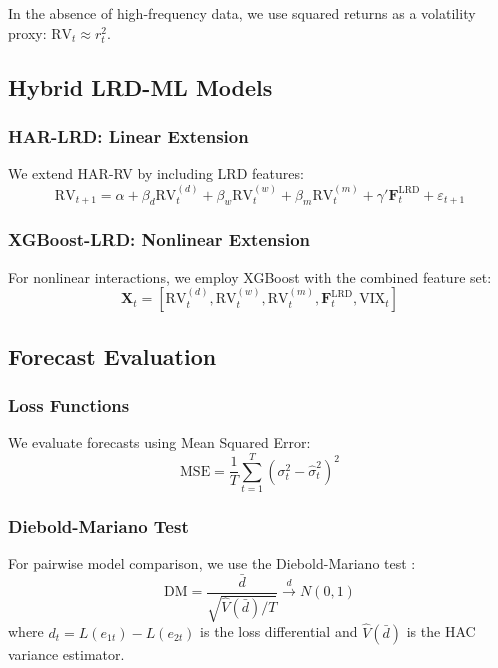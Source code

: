 \documentclass[12pt,a4paper]{article}
\newcommand{\RV}{\text{RV}}
\newcommand{\VIX}{\text{VIX}}
\newcommand{\MSE}{\text{MSE}}
\begin{document}
In the absence of high-frequency data, we use squared returns as a volatility proxy: $\RV_t \approx r_t^2$.

\subsection{Hybrid LRD-ML Models}

\subsubsection{HAR-LRD: Linear Extension}

We extend HAR-RV by including LRD features:
\begin{equation}
    \RV_{t+1} = \alpha + \beta_d \RV_t^{(d)} + \beta_w \RV_t^{(w)} + \beta_m \RV_t^{(m)} + \gamma' \mathbf{F}_t^{\text{LRD}} + \varepsilon_{t+1}
\end{equation}

\subsubsection{XGBoost-LRD: Nonlinear Extension}

For nonlinear interactions, we employ XGBoost \citep{chen2016xgboost} with the combined feature set:
\begin{equation}
    \mathbf{X}_t = [\RV_t^{(d)}, \RV_t^{(w)}, \RV_t^{(m)}, \mathbf{F}_t^{\text{LRD}}, \VIX_t]
\end{equation}

\subsection{Forecast Evaluation}

\subsubsection{Loss Functions}

We evaluate forecasts using Mean Squared Error:
\begin{equation}
    \MSE = \frac{1}{T}\sum_{t=1}^T (\sigma_t^2 - \hat{\sigma}_t^2)^2
\end{equation}

\subsubsection{Diebold-Mariano Test}

For pairwise model comparison, we use the Diebold-Mariano test \citep{diebold1995comparing}:
\begin{equation}
    \text{DM} = \frac{\bar{d}}{\sqrt{\hat{V}(\bar{d})/T}} \xrightarrow{d} N(0,1)
\end{equation}
where $d_t = L(e_{1t}) - L(e_{2t})$ is the loss differential and $\hat{V}(\bar{d})$ is the HAC variance estimator.
\end{document}
